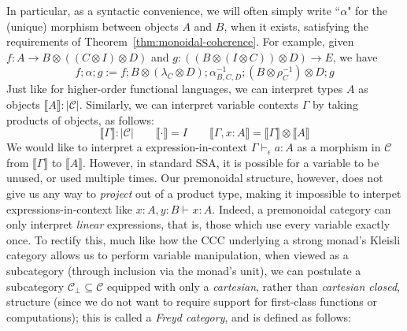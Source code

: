 \documentclass[acmsmall,screen,review]{acmart}
\newcommand{\mc}[1]{\ensuremath{\mathcal{#1}}}
\newcommand{\bhyp}[2]{#1 : #2}
\newcommand{\hasty}[4]{#1 \vdash_{#2} #3: {#4}}
\newcommand{\dnt}[1]{\llbracket{#1}\rrbracket}
\begin{document}
In particular, as a syntactic convenience, we will often simply write ``$\alpha$" for the (unique)
morphism between objects $A$ and $B$, when it exists, satisfying the requirements of
Theorem~\ref{thm:monoidal-coherence}. For example, given $f : A \to B \otimes ((C \otimes I)
\otimes D)$ and $g : ((B \otimes (I \otimes C)) \otimes D) \to E$, we have
$$
f;\alpha;g := 
  f ; 
  B \otimes (\lambda_C \otimes D) ; 
  \alpha_{B, C, D}^{-1} ; 
  (B \otimes \rho_C^{-1}) \otimes D ;
  g 
$$
Just like for higher-order functional languages, we can interpret types $A$ as objects $\dnt{A} :
|\mc{C}|$. Similarly, we can interpret variable contexts $\Gamma$ by taking products of objects, as
follows:
$$
\boxed{\dnt{\Gamma} : |\mc{C}|} \qquad 
  \dnt{\cdot} = I \qquad \dnt{\Gamma, \bhyp{x}{A}} = \dnt{\Gamma} \otimes \dnt{A}
$$
We would like to interpret a expression-in-context $\hasty{\Gamma}{\epsilon}{a}{A}$ as a morphism in
$\mc{C}$ from $\dnt{\Gamma}$ to $\dnt{A}$. However, in standard SSA, it is possible for a variable
to be unused, or used multiple times. Our premonoidal structure, however, does not give us any way
to \emph{project} out of a product type, making it impossible to interpet expressions-in-context
like
$
\hasty{\bhyp{x}{A}, \bhyp{y}{B}}{}{x}{A}
$. 
Indeed, a premonoidal category can only interpret \emph{linear} expressions, that is, those which
use every variable exactly once. To rectify this, much like how the CCC underlying a strong monad's
Kleisli category allows us to perform variable manipulation, when viewed as a subcategory (through
inclusion via the monad's unit), we can postulate a subcategory $\mc{C}_\bot \subseteq \mc{C}$
equipped with only a \emph{cartesian}, rather than \emph{cartesian closed}, structure (since we do
not want to require support for first-class functions or computations); this is called a \emph{Freyd
category}, and is defined as follows:
\end{document}
